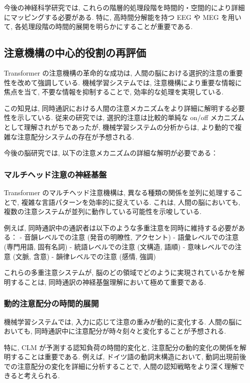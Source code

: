 今後の神経科学研究では, これらの階層的処理段階を時間的・空間的により詳細にマッピングする必要がある.
特に, 高時間分解能を持つ EEG や MEG を用いて, 各処理段階の時間的展開を明らかにすることが重要である.

\subsection{注意機構の中心的役割の再評価}

Transformer の注意機構の革命的な成功は, 人間の脳における選択的注意の重要性を改めて強調している.
機械学習システムでは, 注意機構により重要な情報に焦点を当て, 不要な情報を抑制することで, 効率的な処理を実現している.

この知見は, 同時通訳における人間の注意メカニズムをより詳細に解明する必要性を示している.
従来の研究では, 選択的注意は比較的単純な on/off メカニズムとして理解されがちであったが, 機械学習システムの分析からは, より動的で複雑な注意配分システムの存在が予想される.

今後の脳研究では, 以下の注意メカニズムの詳細な解明が必要である：

\subsubsection{マルチヘッド注意の神経基盤}

Transformer のマルチヘッド注意機構は, 異なる種類の関係を並列に処理することで, 複雑な言語パターンを効率的に捉えている.
これは, 人間の脳においても, 複数の注意システムが並列に動作している可能性を示唆している.

例えば, 同時通訳中の通訳者は以下のような多重注意を同時に維持する必要がある：
- 音韻レベルでの注意 (発音の明瞭性, アクセント)
- 語彙レベルでの注意 (専門用語, 固有名詞)
- 統語レベルでの注意 (文構造, 語順)
- 意味レベルでの注意 (文脈, 含意)
- 韻律レベルでの注意 (感情, 強調)

これらの多重注意システムが, 脳のどの領域でどのように実現されているかを解明することは, 同時通訳の神経基盤理解において極めて重要である.

\subsubsection{動的注意配分の時間的展開}

機械学習システムでは, 入力に応じて注意の重みが動的に変化する.
人間の脳においても, 同時通訳中に注意配分が時々刻々と変化することが予想される.

特に, CLM が予測する認知負荷の時間的変化と, 注意配分の動的変化の関係を解明することは重要である.
例えば, ドイツ語の動詞末構造において, 動詞出現前後での注意配分の変化を詳細に分析することで, 人間の認知戦略をより深く理解できると考えられる.

